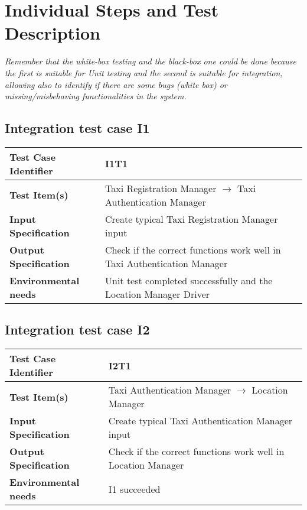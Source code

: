 \section{Individual Steps and Test Description}
\emph{Remember that the white-box testing and the black-box one could be done because the first is suitable for Unit testing and the second is suitable for integration, allowing also to identify if there are some bugs (white box) or missing/misbehaving functionalities in the system.}
\subsection{Integration test case I1}
\begin{tabular} {l p{9cm}}
	\hline \textbf{Test Case Identifier} & I1T1 \\
	\hline \textbf{Test Item(s)} & Taxi Registration Manager $\rightarrow$ Taxi Authentication Manager  \\
	\hline \textbf{Input Specification} & Create typical Taxi Registration Manager input \\
	\hline \textbf{Output Specification} & Check if the correct functions work well in Taxi Authentication Manager \\
	\hline \textbf{Environmental needs} & Unit test completed successfully and the Location Manager Driver \\
	\hline 
\end{tabular}
\vspace{0.5cm}
\subsection{Integration test case I2}
\begin{tabular} {l p{9cm}}
	\hline \textbf{Test Case Identifier} & I2T1 \\
	\hline \textbf{Test Item(s)} & Taxi Authentication Manager $\rightarrow$ Location Manager \\
	\hline \textbf{Input Specification} & Create typical Taxi Authentication Manager input \\
	\hline \textbf{Output Specification} & Check if the correct functions work well in Location Manager \\
	\hline \textbf{Environmental needs} & I1 succeeded \\
	\hline 
\end{tabular}
\vspace{0.5cm}
